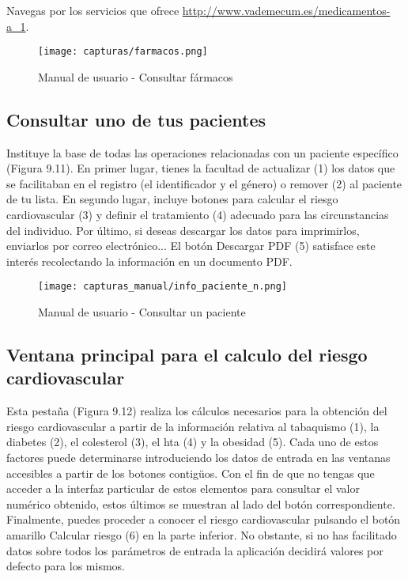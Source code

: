 \documentclass[11pt,spanish,
		listoftables,listoffigures]
		{tfgplantilla}
\begin{document}
Navegas por los servicios que ofrece \url {http://www.vademecum.es/medicamentos-a_1}.

\begin{figure}[H]
\centering
\texttt{[image: capturas/farmacos.png]}
\caption{Manual de usuario - Consultar fármacos}
\end{figure}

\subsection {Consultar uno de tus pacientes}

Instituye la base de todas las operaciones relacionadas con un paciente específico (Figura 9.11). En primer lugar, tienes la facultad de actualizar (1) los datos que se facilitaban en el registro (el identificador y el género) o remover (2) al paciente de tu lista. En segundo lugar, incluye botones para calcular el riesgo cardiovascular (3) y definir el tratamiento (4) adecuado para las circunstancias del individuo. Por último, si deseas descargar los datos para imprimirlos, enviarlos por correo electrónico... El botón \textquotedbl Descargar PDF\textquotedbl{} (5) satisface este interés recolectando la información en un documento PDF.

\begin{figure}[H]
\centering
\texttt{[image: capturas\_manual/info\_paciente\_n.png]}
\caption{Manual de usuario - Consultar un paciente}
\end{figure}

\newpage
\subsection {Ventana principal para el calculo del riesgo cardiovascular}

Esta pestaña (Figura 9.12) realiza los cálculos necesarios para la obtención del riesgo cardiovascular a partir de la información relativa al tabaquismo (1), la diabetes (2), el colesterol (3), el hta (4) y la obesidad (5). Cada uno de estos factores puede determinarse introduciendo los datos de entrada en las ventanas accesibles a partir de los botones contigüos. Con el fin de que no tengas que acceder a la interfaz particular de estos elementos para consultar el valor numérico obtenido, estos últimos se muestran al lado del botón correspondiente. Finalmente, puedes proceder a conocer el riesgo cardiovascular pulsando el botón amarillo \textquotedbl Calcular riesgo\textquotedbl{} (6) en la parte inferior. No obstante, si no has facilitado datos sobre todos los parámetros de entrada la aplicación decidirá valores por defecto para los mismos.
\end{document}
